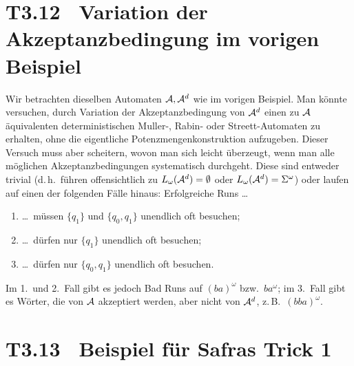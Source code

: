 \documentclass[fontsize=11pt, twoside=false, numbers=autoenddot]{scrbook}
\begin{document}
\goodbreak
\section*{T3.12~ Variation der Akzeptanzbedingung im vorigen Beispiel}

Wir betrachten dieselben Automaten $\mathcal{A},\mathcal{A}^d$ wie im vorigen Beispiel.
Man könnte versuchen, durch Variation der Akzeptanzbedingung von $\mathcal{A}^d$
einen zu $\mathcal{A}$ äquivalenten deterministischen Muller-, Rabin- oder Streett-Automaten
zu erhalten, ohne die eigentliche Potenzmengenkonstruktion aufzugeben.
Dieser Versuch muss aber scheitern, wovon man sich leicht überzeugt,
wenn man alle möglichen Akzeptanzbedingungen systematisch durchgeht.
Diese sind entweder trivial (d.\,h.\ führen offensichtlich zu $L_\omega(\mathcal{A}^d) = \emptyset$
oder $L_\omega(\mathcal{A}^d) = \Sigma^\omega$)
oder laufen auf einen der folgenden Fälle hinaus:
Erfolgreiche Runs \dots
%
\begin{enumerate}
  \item
    \dots\ müssen $\{q_1\}$ und $\{q_0,q_1\}$ unendlich oft besuchen;
  \item
    \dots\ dürfen nur $\{q_1\}$ unendlich oft besuchen;
  \item
    \dots\ dürfen nur $\{q_0,q_1\}$ unendlich oft besuchen.
\end{enumerate}
%
Im 1.\ und 2.\ Fall gibt es jedoch Bad Runs auf $(ba)^\omega$ bzw.\ $ba^\omega$;
im 3.\ Fall gibt es Wörter, die von $\mathcal{A}$ akzeptiert werden,
aber nicht von $\mathcal{A}^d$, z.\,B.\ $(bba)^\omega$.

\section*{T3.13~ Beispiel für Safras Trick 1}
\end{document}
